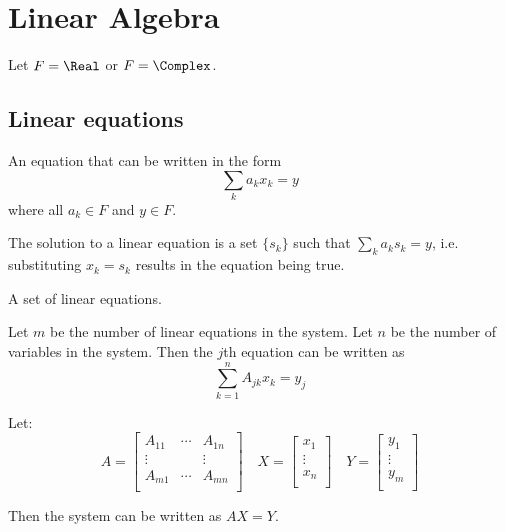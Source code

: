 \chapter{Linear Algebra}

Let $F = \Real$ or $F = \Complex$.

\section{Linear equations}

\begin{definition}
  An equation that can be written in the form
  \[
      \sum_k a_k x_k = y
  \]
  where all $a_k \in F$ and $y \in F$.
\end{definition}

\begin{definition}
  The solution to a linear equation is a set $\{ s_k \}$ such that $\sum_k a_k s_k = y$, i.e. substituting $x_k = s_k$ results in the equation being true.
\end{definition}

\begin{definition}
  A set of linear equations.

  Let $m$ be the number of linear equations in the system. Let $n$ be the number of variables in the system. Then the $j$th equation can be written as
  \[
    \sum_{k = 1}^n A_{jk} x_k = y_j
  \]

  Let:
  \[
    A = \begin{bmatrix}
      A_{11} & \cdots & A_{1n} \\
      \vdots &        & \vdots \\
      A_{m1} & \cdots & A_{mn} \\
    \end{bmatrix}
    \quad
    X = \begin{bmatrix}
      x_1 \\
      \vdots \\
      x_n \\
    \end{bmatrix}
    \quad
    Y = \begin{bmatrix}
      y_1 \\
      \vdots \\
      y_m \\
    \end{bmatrix}
  \]

  Then the system can be written as $AX = Y$.
\end{definition}

